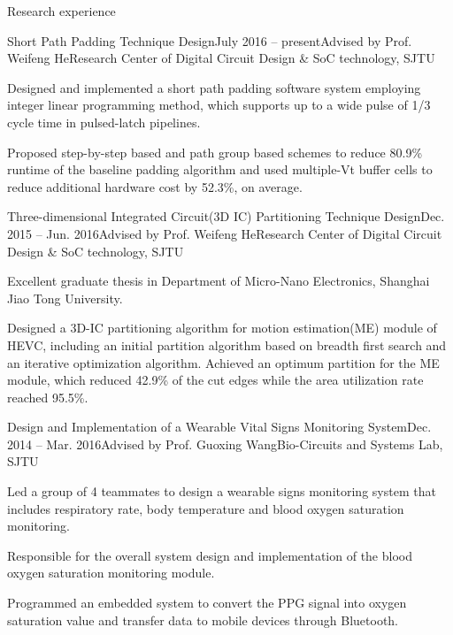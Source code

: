\documentclass{resume_ucla} %
\begin{document}
\begin{rSection}{Research experience}
\begin{rSubsection}{Short Path Padding Technique Design}{July 2016 -- present}{Advised by Prof. Weifeng He}{Research Center of Digital Circuit Design \& SoC technology, SJTU}
\item Designed and implemented a short path padding software system employing integer linear programming method, which supports up to a wide pulse of 1/3 cycle time in pulsed-latch pipelines.
\item Proposed step-by-step based and path group based schemes to reduce 80.9\% runtime of the baseline padding algorithm and used multiple-Vt buffer cells to reduce additional hardware cost by 52.3\%, on average. 
\end{rSubsection}

\begin{rSubsection}{Three-dimensional Integrated Circuit(3D IC) Partitioning Technique Design}{Dec. 2015 -- Jun. 2016}{Advised by Prof. Weifeng He}{Research Center of Digital Circuit Design \& SoC technology, SJTU}
\item Excellent graduate thesis in Department of Micro-Nano Electronics, Shanghai Jiao Tong University.
\item Designed a 3D-IC partitioning algorithm for motion estimation(ME) module of HEVC, including an initial partition algorithm based on breadth first search and an iterative optimization algorithm. Achieved an optimum partition for the ME module, which reduced 42.9\% of the cut edges while the area utilization rate reached 95.5\%.
\end{rSubsection}

\begin{rSubsection}{Design and Implementation of a Wearable Vital Signs Monitoring System}{Dec. 2014 -- Mar. 2016}{Advised by Prof. Guoxing Wang}{Bio-Circuits and Systems Lab, SJTU}
\item Led a group of 4 teammates to design a wearable signs monitoring system that includes respiratory rate, body temperature and blood oxygen saturation monitoring. 
\item Responsible for the overall system design and implementation of the blood oxygen saturation monitoring module.
\item Programmed an embedded system to convert the PPG signal into oxygen saturation value and transfer data to mobile devices through Bluetooth.
\end{rSubsection}


\end{rSection}
\end{document}
